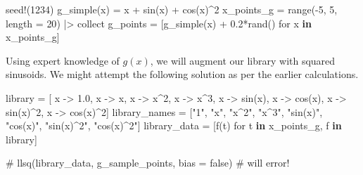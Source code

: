 \documentclass[
]{article}
\newenvironment{Shaded}{\begin{snugshade}}{\end{snugshade}}
\newcommand{\CommentTok}[1]{\textcolor[rgb]{0.37,0.37,0.37}{#1}}
\newcommand{\FloatTok}[1]{\textcolor[rgb]{0.68,0.00,0.00}{#1}}
\newcommand{\FunctionTok}[1]{\textcolor[rgb]{0.28,0.35,0.67}{#1}}
\newcommand{\KeywordTok}[1]{\textcolor[rgb]{0.00,0.23,0.31}{\textbf{#1}}}
\newcommand{\NormalTok}[1]{\textcolor[rgb]{0.00,0.23,0.31}{#1}}
\newcommand{\OperatorTok}[1]{\textcolor[rgb]{0.37,0.37,0.37}{#1}}
\newcommand{\StringTok}[1]{\textcolor[rgb]{0.13,0.47,0.30}{#1}}
\begin{document}
\begin{Shaded}
\begin{Highlighting}[]
\FunctionTok{seed!}\NormalTok{(}\FloatTok{1234}\NormalTok{)}
\FunctionTok{g\_simple}\NormalTok{(x) }\OperatorTok{=}\NormalTok{ x }\OperatorTok{+} \FunctionTok{sin}\NormalTok{(x) }\OperatorTok{+} \FunctionTok{cos}\NormalTok{(x)}\OperatorTok{\^{}}\FloatTok{2}
\NormalTok{x\_points\_g }\OperatorTok{=} \FunctionTok{range}\NormalTok{(}\OperatorTok{{-}}\FloatTok{5}\NormalTok{, }\FloatTok{5}\NormalTok{, length }\OperatorTok{=} \FloatTok{20}\NormalTok{) }\OperatorTok{|\textgreater{}}\NormalTok{ collect}
\NormalTok{g\_points }\OperatorTok{=}\NormalTok{ [}\FunctionTok{g\_simple}\NormalTok{(x) }\OperatorTok{+} \FloatTok{0.2}\FunctionTok{*rand}\NormalTok{() for x }\KeywordTok{in}\NormalTok{ x\_points\_g]}
\end{Highlighting}
\end{Shaded}

Using expert knowledge of \(g(x)\), we will augment our library with
squared sinusoids. We might attempt the following solution as per the
earlier calculations.

\begin{Shaded}
\begin{Highlighting}[]
\NormalTok{library }\OperatorTok{=}\NormalTok{ [}
\NormalTok{  x }\OperatorTok{{-}\textgreater{}} \FloatTok{1.0}\NormalTok{, x }\OperatorTok{{-}\textgreater{}}\NormalTok{ x, x }\OperatorTok{{-}\textgreater{}}\NormalTok{ x}\OperatorTok{\^{}}\FloatTok{2}\NormalTok{, x }\OperatorTok{{-}\textgreater{}}\NormalTok{ x}\OperatorTok{\^{}}\FloatTok{3}\NormalTok{, }
\NormalTok{  x }\OperatorTok{{-}\textgreater{}} \FunctionTok{sin}\NormalTok{(x), x }\OperatorTok{{-}\textgreater{}} \FunctionTok{cos}\NormalTok{(x), }
\NormalTok{  x }\OperatorTok{{-}\textgreater{}} \FunctionTok{sin}\NormalTok{(x)}\OperatorTok{\^{}}\FloatTok{2}\NormalTok{, x }\OperatorTok{{-}\textgreater{}} \FunctionTok{cos}\NormalTok{(x)}\OperatorTok{\^{}}\FloatTok{2}\NormalTok{]}
\NormalTok{library\_names }\OperatorTok{=}\NormalTok{ [}\StringTok{"1"}\NormalTok{, }\StringTok{"x"}\NormalTok{, }\StringTok{"x\^{}2"}\NormalTok{, }\StringTok{"x\^{}3"}\NormalTok{, }\StringTok{"sin(x)"}\NormalTok{, }\StringTok{"cos(x)"}\NormalTok{, }\StringTok{"sin(x)\^{}2"}\NormalTok{, }\StringTok{"cos(x)\^{}2"}\NormalTok{]}
\NormalTok{library\_data }\OperatorTok{=}\NormalTok{ [}\FunctionTok{f}\NormalTok{(t) for t }\KeywordTok{in}\NormalTok{ x\_points\_g, f }\KeywordTok{in}\NormalTok{ library]}

\CommentTok{\# llsq(library\_data, g\_sample\_points, bias = false) \# will error!}
\end{Highlighting}
\end{Shaded}
\end{document}
